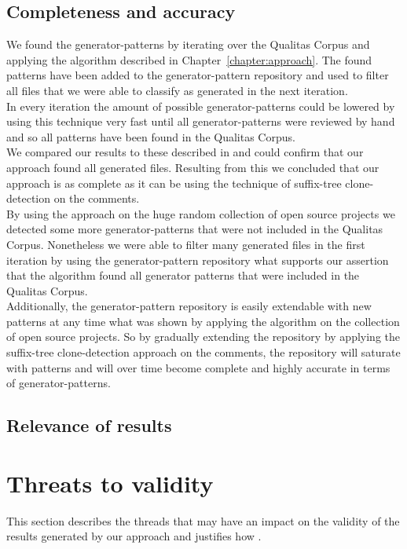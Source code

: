 \subsection{Completeness and accuracy}
We found the generator-patterns by iterating over the Qualitas Corpus and applying the algorithm described in Chapter~\ref{chapter:approach}. The found patterns have been added to the generator-pattern repository and used to filter all files that we were able to classify as generated in the next iteration.\\
In every iteration the amount of possible generator-patterns could be lowered by using this technique very fast until all generator-patterns were reviewed by hand and so all patterns have been found in the Qualitas Corpus.\\
We compared our results to these described in \cite{Bernwieser2014} and could confirm that our approach found all generated files. Resulting from this we concluded that our approach is as complete as it can be using the technique of suffix-tree clone-detection on the comments.\\
By using the approach on the huge random collection of open source projects we detected some more generator-patterns that were not included in the Qualitas Corpus. Nonetheless we were able to filter many generated files in the first iteration by using the generator-pattern repository what supports our assertion that the algorithm found all generator patterns that were included in the Qualitas Corpus.\\
Additionally, the generator-pattern repository is easily extendable with new patterns at any time what was shown by applying the algorithm on the collection of open source projects. So by gradually extending the repository by applying the suffix-tree clone-detection approach on the comments, the repository will saturate with patterns and will over time become complete and highly accurate in terms of generator-patterns.

\subsection{Relevance of results}


\section{Threats to validity}
This section describes the threads that may have an impact on the validity of the results generated by our approach and justifies how .
